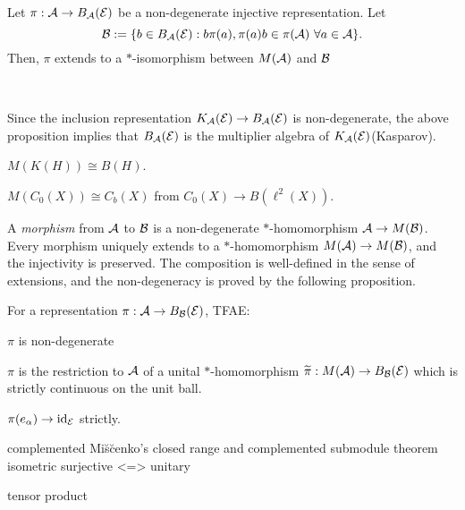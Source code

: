 \documentclass{../../small}
\begin{document}
\begin{prop}
Let $\pi:\mathcal{A}\to B_{\mathcal{A}}(\mathcal{E})$ be a non-degenerate injective representation.
Let
\[\mathcal{B}:=\{b\in B_{\mathcal{A}}(\mathcal{E}):b\pi(a),\pi(a)b\in\pi(\mathcal{A})\ \forall a\in\mathcal{A}\}.\]
Then, $\pi$ extends to a $*$-isomorphism between $M(\mathcal{A})$ and $\mathcal{B}$
\end{prop}
\begin{pf}

\end{pf}

\begin{ex}\,
\begin{parts}
\item
Since the inclusion representation $K_{\mathcal{A}}(\mathcal{E})\to B_{\mathcal{A}}(\mathcal{E})$ is non-degenerate, the above proposition implies that $B_{\mathcal{A}}(\mathcal{E})$ is the multiplier algebra of $K_{\mathcal{A}}(\mathcal{E})$(Kasparov).
\item $M(K(H))\cong B(H)$.
\item $M(C_0(X))\cong C_b(X)$ from $C_0(X)\to B(\ell^2(X))$.
\end{parts}
\end{ex}

\begin{defn}
A \emph{morphism} from $\mathcal{A}$ to $\mathcal{B}$ is a non-degenerate $*$-homomorphism $\mathcal{A}\to M(\mathcal{B})$.
Every morphism uniquely extends to a $*$-homomorphism $M(\mathcal{A})\to M(\mathcal{B})$, and the injectivity is preserved.
The composition is well-defined in the sense of extensions, and the non-degeneracy is proved by the following proposition.
\end{defn}
\begin{lem}
For a representation $\pi:\mathcal{A}\to B_{\mathcal{B}}(\mathcal{E})$, TFAE:
\begin{parts}
\item $\pi$ is non-degenerate
\item $\pi$ is the restriction to $\mathcal{A}$ of a unital $*$-homomorphism $\widetilde\pi:M(\mathcal{A})\to B_{\mathcal{B}}(\mathcal{E})$ which is strictly continuous on the unit ball.
\item $\pi(e_\alpha)\to\operatorname{id}_{\mathcal{E}}$ strictly.
\end{parts}
\end{lem}





complemented
Mi\u s\u cenko's closed range and complemented submodule theorem
isometric surjective <=> unitary

tensor product
\end{document}
